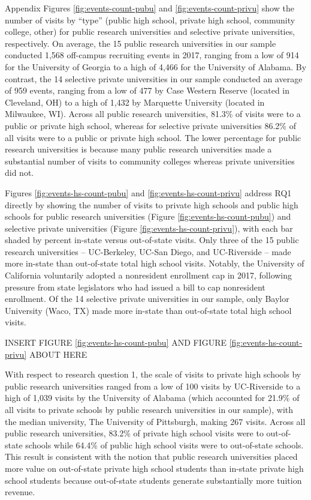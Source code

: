 \documentclass[
  12pt,
]{article}
\begin{document}
Appendix Figures \ref{fig:events-count-pubu} and \ref{fig:events-count-privu} show the number of visits by ``type'' (public high school, private high school, community college, other) for public research universities and selective private universities, respectively. On average, the 15 public research universities in our sample conducted 1,568 off-campus recruiting events in 2017, ranging from a low of 914 for the University of Georgia to a high of 4,466 for the University of Alabama. By contrast, the 14 selective private universities in our sample conducted an average of 959 events, ranging from a low of 477 by Case Western Reserve (located in Cleveland, OH) to a high of 1,432 by Marquette University (located in Milwaukee, WI). Across all public research universities, 81.3\% of visits were to a public or private high school, whereas for selective private universities 86.2\% of all visits were to a public or private high school. The lower percentage for public research universities is because many public research universities made a substantial number of visits to community colleges whereas private universities did not.

Figures \ref{fig:events-hs-count-pubu} and \ref{fig:events-hs-count-privu} address RQ1 directly by showing the number of visits to private high schools and public high schools for public research universities (Figure \ref{fig:events-hs-count-pubu}) and selective private universities (Figure \ref{fig:events-hs-count-privu}), with each bar shaded by percent in-state versus out-of-state visits. Only three of the 15 public research universities -- UC-Berkeley, UC-San Diego, and UC-Riverside -- made more in-state than out-of-state total high school visits. Notably, the University of California voluntarily adopted a nonresident enrollment cap in 2017, following pressure from state legislators who had issued a bill to cap nonresident enrollment. Of the 14 selective private universities in our sample, only Baylor University (Waco, TX) made more in-state than out-of-state total high school visits.

INSERT FIGURE \ref{fig:events-hs-count-pubu} AND FIGURE \ref{fig:events-hs-count-privu} ABOUT HERE

With respect to research question 1, the scale of visits to private high schools by public research universities ranged from a low of 100 visits by UC-Riverside to a high of 1,039 visits by the University of Alabama (which accounted for 21.9\% of all visits to private schools by public research universities in our sample), with the median university, The University of Pittsburgh, making 267 visits. Across all public research universities, 83.2\% of private high school visits were to out-of-state schools while 64.4\% of public high school visits were to out-of-state schools. This result is consistent with the notion that public research universities placed more value on out-of-state private high school students than in-state private high school students because out-of-state students generate substantially more tuition revenue.
\end{document}
